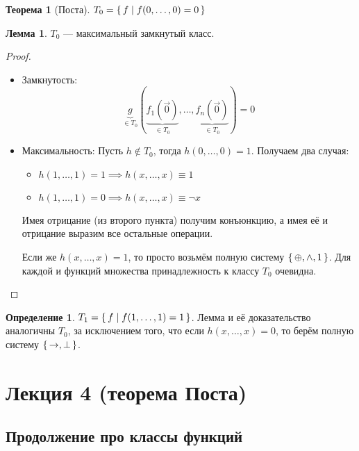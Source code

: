 \documentclass[12pt]{article}
\let\im\rightarrow
\let\eq\equiv
\let\la\land
\let\n\neg
\let\nin\notin
\theoremstyle{definition}
\newtheorem{definition}{Определение}[section]
\newtheorem{theorem}{Теорема}[section]
\theoremstyle{statement}
\theoremstyle{theorem}
\newtheorem{lemma}{Лемма}[section]
\begin{document}
\begin{theorem}[Поста]
  $T_0 = \set{f \mid f(0, \ldots, 0) = 0}$
  \begin{lemma}
    $T_0$ --- максимальный замкнутый класс.
    \begin{proof}
      \begin{itemize}
        \item Замкнутость:
          \begin{displaymath}
            \underbrace{g}_{\in T_0}(\underbrace{f_1(\vec{0})}_{\in
              T_0}, \ldots,
            \underbrace{f_n(\vec{0})}_{\in T_0}) = 0
          \end{displaymath}

        \item Максимальность:
          Пусть $h \nin T_0$, тогда $h(0, \ldots, 0) = 1$. Получаем два случая:
          \begin{itemize}
            \item $h(1, \ldots, 1) = 1 \implies h(x, \ldots, x) \eq 1$

            \item $h(1, \ldots, 1) = 0 \implies h(x, \ldots, x) \eq \n x$
          \end{itemize}
          Имея отрицание (из второго пункта) получим конъюнкцию, а
          имея её и отрицание выразим все остальные операции.

          Если же $h(x, \dots, x) = 1$, то просто возьмём полную
          систему $\set{\oplus, \la, 1}$. Для каждой и функций
          множества принадлежность к классу $T_0$ очевидна.
      \end{itemize}
    \end{proof}
  \end{lemma}

  \begin{definition}
    $T_1 = \set{f \mid f(1, \ldots, 1) = 1}$. Лемма и её
    доказательство аналогичны $T_0$, за исключением того, что если
    $h(x, \dots, x) = 0$, то берём полную систему $\set{\im, \perp}$.
  \end{definition}
\end{theorem}

\pagebreak

\section{Лекция 4 (теорема Поста)}

\subsection{Продолжение про классы функций}
\end{document}
